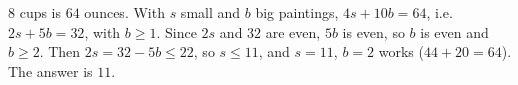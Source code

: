 $8$ cups is $64$ ounces. With $s$ small and $b$ big paintings, $4s+10b=64$, i.e. $2s+5b=32$, with $b\ge1$. Since $2s$ and $32$ are even, $5b$ is even, so $b$ is even and $b\ge2$. Then $2s=32-5b\le22$, so $s\le11$, and $s=11$, $b=2$ works ($44+20=64$). The answer is $\boxed{11}$.
